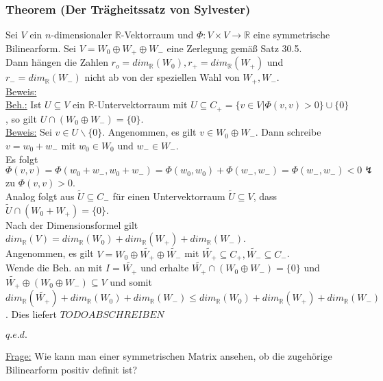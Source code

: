 \documentclass[a4paper]{article}
\newcommand{\ul}{\underline}
\renewcommand{\proof}{\ul{Beweis:}\\}
\renewcommand{\qed}{\begin{flushright}
\ul{\(q.e.d.\)}
\end{flushright}}
\begin{document}
\subsubsection{Theorem (Der Trägheitssatz von Sylvester)}
Sei \(V\) ein \(n\)-dimensionaler \(\mathbb{R}\)-Vektorraum und \(\Phi:V\times V\rightarrow\mathbb{R}\) eine symmetrische Bilinearform. Sei \(V=W_0\oplus W_+\oplus W_-\) eine Zerlegung gemäß Satz 30.5.\\
Dann hängen die Zahlen \(r_o=dim_\mathbb{R}(W_0),r_+=dim_\mathbb{R}(W_+)\) und \(r_-=dim_\mathbb{R}(W_-)\) nicht ab von der speziellen Wahl von \(W_+,W_-\).\\
\proof
\ul{Beh.:} Ist \(U\subseteq V\) ein \(\mathbb{R}\)-Untervektorraum mit \(U\subseteq C_+=\{v\in V|\Phi(v,v)>0\}\cup\{0\}\), so gilt \(U\cap(W_0\oplus W_-)=\{0\}\).\\
\ul{Beweis:} Sei \(v\in U\backslash\{0\}\). Angenommen, es gilt \(v\in W_0\oplus W_-\). Dann schreibe \(v=w_0+w_-\) mit \(w_0\in W_0\) und \(w_-\in W_-\).\\
Es folgt \(\Phi(v,v)=\Phi(w_0+w_-,w_0+w_-)=\Phi(w_0,w_0)+\Phi(w_-,w_-)=\Phi(w_-,w_-)<0\lightning\) zu \(\Phi(v,v)>0\).\\
Analog folgt aus \(\tilde{U}\subseteq C_-\) für einen Untervektorraum \(\tilde{U}\subseteq V\), dass \(\tilde{U}\cap(W_0+W_+)=\{0\}\).\\
Nach der Dimensionsformel gilt \(dim_\mathbb{R}(V)=dim_\mathbb{R}(W_0)+dim_\mathbb{R}(W_+)+dim_\mathbb{R}(W_-)\).\\
Angenommen, es gilt \(V=W_0\oplus \tilde{W_+}\oplus \tilde{W_-}\) mit \(\tilde{W_+}\subseteq C_+,\tilde{W_-}\subseteq C_-\).\\
Wende die Beh. an mit \(I=\tilde{W_+}\) und erhalte \(\tilde{W_+}\cap(W_0\oplus W_-)=\{0\}\) und \(\tilde{W_+}\oplus (W_0\oplus W_-)\subseteq V\) und somit \(dim_\mathbb{R}(\tilde{W_+})+dim_\mathbb{R}(W_0)+dim_\mathbb{R}(W_-)\leq dim_\mathbb{R}(W_0)+dim_\mathbb{R}(W_+)+dim_\mathbb{R}(W_-)\). Dies liefert \(TODO ABSCHREIBEN\)
\qed
\ul{Frage:} Wie kann man einer symmetrischen Matrix ansehen, ob die zugehörige Bilinearform positiv definit ist?
\end{document}
